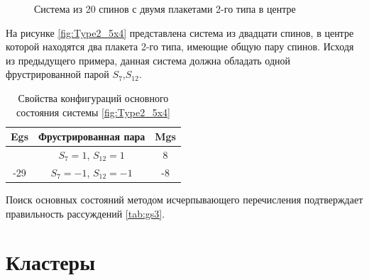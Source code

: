 \documentclass[utf8, babel, sor, jor, amsmath, amssymb, reprint]{elsarticle} %
\begin{document}
\begin{figure}[H]
	\centering
	\caption{Система из 20 спинов с двумя плакетами 2-го типа в центре}
	\label{fig:Type2_5x4}
\end{figure}

На рисунке \eqref{fig:Type2_5x4} представлена система из двадцати спинов, в центре которой находятся два плакета 2-го типа, имеющие общую пару спинов. Исходя из предыдущего примера, данная система должна обладать одной фрустрированной парой  $S_7$,$S_12$.

\begin{table}[H]
	\centering
	\begin{tabular}{|c|c|c|}
		\hline
		Egs   &   Фрустрированная пара & Mgs\\
		\hline
		&  $S_7=1$, $S_{12}=1$ & 8 \\
		\cline{2-3}
		-29	\multirow{3}{*}{}
		&   $S_7=-1$, $S_{12}=-1$ & -8 \\
		\hline
	\end{tabular}
	\caption{Свойства конфигураций основного состояния системы \eqref{fig:Type2_5x4}}
	\label{tab:gs3}
\end{table}

Поиск основных состояний методом исчерпывающего перечисления подтверждает правильность рассуждений \eqref{tab:gs3}.

\section{Кластеры}
\end{document}
